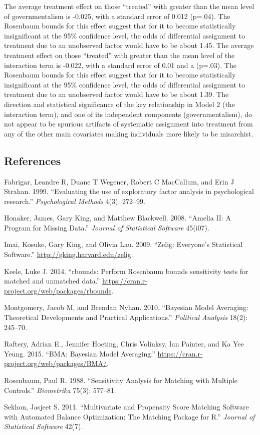 \documentclass[12pt,]{article}
\begin{document}
The average treatment effect on those ``treated'' with greater than the
mean level of governmentalism is -0.025, with a standard error of 0.012
(p=.04). The Rosenbaum bounds for this effect suggest that for it to
become statistically insignificant at the 95\% confidence level, the
odds of differential assignment to treatment due to an unobserved factor
would have to be about 1.45. The average treatment effect on those
``treated'' with greater than the mean level of the interaction term is
-0.022, with a standard error of 0.01 and a (p=.03). The Rosenbaum
bounds for this effect suggest that for it to become statistically
insignificant at the 95\% confidence level, the odds of differential
assignment to treatment due to an unobserved factor would have to be
about 1.39. The direction and statistical significance of the key
relationship in Model 2 (the interaction term), and one of its
independent components (governmentalism), do not appear to be spurious
artifacts of systematic assignment into treatment from any of the other
main covariates making individuals more likely to be misarchist.

\clearpage

\subsection{References}

Fabrigar, Leandre R, Duane T Wegener, Robert C MacCallum, and Erin J
Strahan. 1999. ``Evaluating the use of exploratory factor analysis in
psychological research.'' \emph{Psychological Methods} 4(3): 272--99.

Honaker, James, Gary King, and Matthew Blackwell. 2008. ``Amelia II: A
Program for Missing Data.'' \emph{Journal of Statistical Software}
45(i07).

Imai, Kosuke, Gary King, and Olivia Lau. 2009. ``Zelig: Everyone's
Statistical Software.'' \url{http://gking.harvard.edu/zelig}.

Keele, Luke J. 2014. ``rbounds: Perform Rosenbaum bounds sensitivity
tests for matched and unmatched data.''
\url{https://cran.r-project.org/web/packages/rbounds}.

Montgomery, Jacob M, and Brendan Nyhan. 2010. ``Bayesian Model
Averaging: Theoretical Developments and Practical Applications.''
\emph{Political Analysis} 18(2): 245--70.

Raftery, Adrian E., Jennifer Hoeting, Chris Volinksy, Ian Painter, and Ka Yee Yeung. 2015. ``BMA: Bayesian Model Averaging.''
\url{https://cran.r-project.org/web/packages/BMA/}.

Rosenbaum, Paul R. 1988. ``Sensitivity Analysis for Matching with
Multiple Controls.'' \emph{Biometrika} 75(3): 577--81.

Sekhon, Jasjeet S. 2011. ``Multivariate and Propensity Score Matching
Software with Automated Balance Optimization: The Matching Package for
R.'' \emph{Journal of Statistical Software} 42(7).
\end{document}
